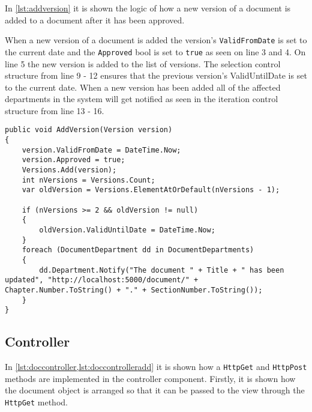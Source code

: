 \documentclass[../../master.tex]{subfiles}
\begin{document}
In \cref{lst:addversion} it is shown the logic of how a new version of a document is added to a document after it has been approved.

When a new version of a document is added the version's \texttt{ValidFromDate} is set to the current date and the \texttt{Approved} bool is set to \texttt{true} as seen on line 3 and 4.
On line 5 the new version is added to the list of versions.
The selection control structure from line 9 - 12 ensures that the previous version's ValidUntilDate is set to the current date.
When a new version has been added all of the affected departments in the system will get notified as seen in the iteration control structure from line 13 - 16.
\\

\begin{lstlisting}[caption={Document Model: AddVersion}, label={lst:addversion}]
public void AddVersion(Version version)
{
	version.ValidFromDate = DateTime.Now;
	version.Approved = true;
	Versions.Add(version);
	int nVersions = Versions.Count;
	var oldVersion = Versions.ElementAtOrDefault(nVersions - 1);

	if (nVersions >= 2 && oldVersion != null)
	{
		oldVersion.ValidUntilDate = DateTime.Now;
	}
	foreach (DocumentDepartment dd in DocumentDepartments)
	{
		dd.Department.Notify("The document " + Title + " has been updated", "http://localhost:5000/document/" + Chapter.Number.ToString() + "." + SectionNumber.ToString());
	}
}
\end{lstlisting}

\subsection{Controller}

In \cref{lst:doccontroller,lst:doccontrolleradd} it is shown how a \texttt{HttpGet} and \texttt{HttpPost} methods are implemented in the controller component.
Firstly, it is shown how the document object is arranged so that it can be passed to the view through the \texttt{HttpGet} method.
\\
\end{document}
